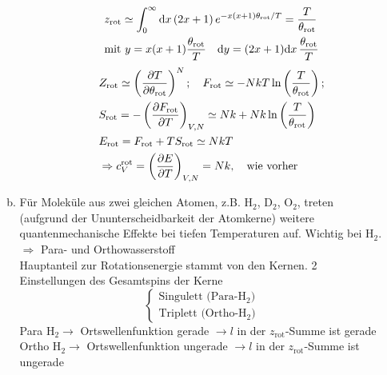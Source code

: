 \begin{enumerate}[A)]
\begin{enumerate}[a)]
\begin{enumerate}[i)]
            \begin{equation}
                \begin{split}
                    & z_\text{rot} \simeq \int_{0}^{\infty} \mathrm{d} x \left( 2 x + 1 \right) e^{-x(x+1) \theta_\text{rot} / T} = \frac{T}{\theta_\text{rot}} \\
                    & \text{mit } y = x(x+1) \frac{\theta_\text{rot}}{T} \quad \mathrm{d} y = (2x+1)\mathrm{d} x \, \frac{\theta_\text{rot}}{T}
                \end{split}
            \end{equation}
            \begin{equation}
                \begin{split}
                    & Z_\text{rot} \simeq \left( \frac{\partial T}{\partial \theta_\text{rot}} \right)_{}^N; \quad F_\text{rot} \simeq - N k T \ln \left( \frac{T}{\theta_\text{rot}} \right); \\
                    & S_\text{rot} = - \left( \frac{\partial F_\text{rot}}{\partial T} \right)_{V, N} \simeq N k + Nk \ln \left( \frac{T}{\theta_\text{rot}} \right) \\
                    & E_\text{rot} = F_\text{rot} + T S_\text{rot} \simeq N k T \\
                    & \Rightarrow c_V^\text{rot} = \left( \frac{\partial E}{\partial T} \right)_{V, N} = N k, \quad \text{wie vorher}
                \end{split}
            \end{equation}
        \end{enumerate}
        \item Für Moleküle aus zwei gleichen Atomen, z.B. H$_2$, D$_2$, O$_2$, treten (aufgrund der Ununterscheidbarkeit der Atomkerne) weitere
        quantenmechanische Effekte bei tiefen Temperaturen auf. Wichtig bei H$_2$. \\
        $\Rightarrow$ Para- und Orthowasserstoff \\
        Hauptanteil zur Rotationsenergie stammt von den Kernen. 2 Einstellungen des Gesamtspins der Kerne
        \begin{equation}
            \begin{cases}
                \text{Singulett (Para-H$_2$)} \\
                \text{Triplett (Ortho-H$_2$)}
            \end{cases}
        \end{equation}
        Para H$_2 \rightarrow$ Ortswellenfunktion gerade $\rightarrow l$ in der $z_\text{rot}$-Summe ist gerade \\
        Ortho H$_2 \rightarrow$ Ortswellenfunktion ungerade $\rightarrow l$ in der $z_\text{rot}$-Summe ist ungerade

\end{enumerate}
\end{enumerate}
